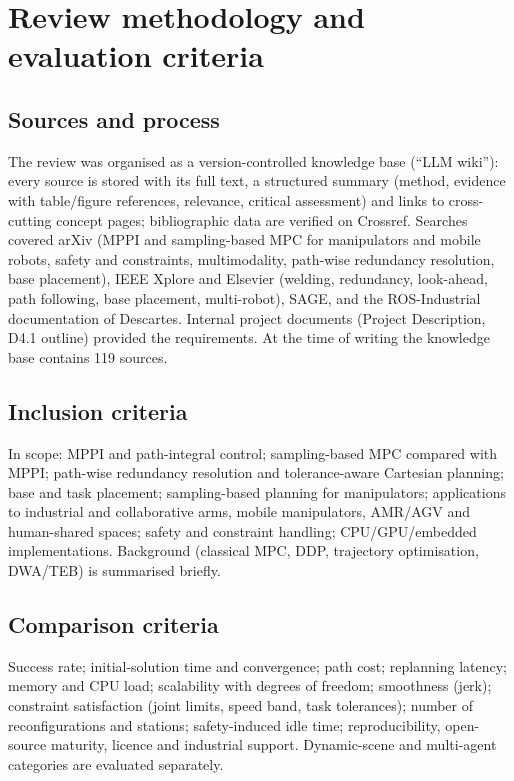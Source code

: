 \documentclass{plan4ari_report}
\begin{document}
\section{Review methodology and evaluation criteria}\label{sec:method}

\subsection{Sources and process}
The review was organised as a version-controlled knowledge base (``LLM wiki''): every source is stored with its full text, a structured summary (method, evidence with table/figure references, relevance, critical assessment) and links to cross-cutting concept pages; bibliographic data are verified on Crossref. Searches covered arXiv (MPPI and sampling-based MPC for manipulators and mobile robots, safety and constraints, multimodality, path-wise redundancy resolution, base placement), IEEE Xplore and Elsevier (welding, redundancy, look-ahead, path following, base placement, multi-robot), SAGE, and the ROS-Industrial documentation of Descartes. Internal project documents (Project Description, D4.1 outline) provided the requirements. At the time of writing the knowledge base contains 119 sources.

\subsection{Inclusion criteria}
In scope: MPPI and path-integral control; sampling-based MPC compared with MPPI; path-wise redundancy resolution and tolerance-aware Cartesian planning; base and task placement; sampling-based planning for manipulators; applications to industrial and collaborative arms, mobile manipulators, AMR/AGV and human-shared spaces; safety and constraint handling; CPU/GPU/embedded implementations. Background (classical MPC, DDP, trajectory optimisation, DWA/TEB) is summarised briefly.

\subsection{Comparison criteria}
Success rate; initial-solution time and convergence; path cost; replanning latency; memory and CPU load; scalability with degrees of freedom; smoothness (jerk); constraint satisfaction (joint limits, speed band, task tolerances); number of reconfigurations and stations; safety-induced idle time; reproducibility, open-source maturity, licence and industrial support. Dynamic-scene and multi-agent categories are evaluated separately.
\end{document}

